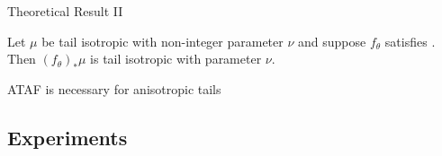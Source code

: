 
\begin{frame}{Theoretical Result II}
    \begin{proposition}
      \label{prop:isotropic-pushforward}
      Let $\mu$ be tail isotropic with non-integer parameter $\nu$
      and suppose $f_\theta$ satisfies .
      Then $(f_\theta)_\ast \mu$ is tail isotropic with parameter $\nu$.
    \end{proposition}
    
    \therefore\quad ATAF is necessary for anisotropic tails

\end{frame}

\subsection{Experiments}

